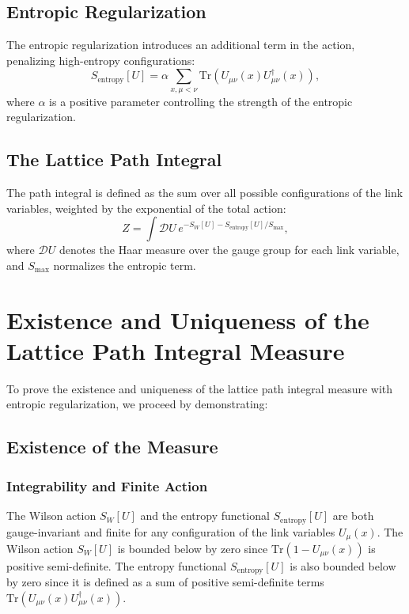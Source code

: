 \subsection{Entropic Regularization}  
The entropic regularization introduces an additional term in the action, penalizing high-entropy configurations:
\begin{equation}
S_{\text{entropy}}[U] = \alpha \sum_{x, \mu < \nu} \text{Tr}\left(U_{\mu\nu}(x) U_{\mu\nu}^\dagger(x)\right),
\end{equation}
where \(\alpha\) is a positive parameter controlling the strength of the entropic regularization.

\subsection{The Lattice Path Integral}  
The path integral is defined as the sum over all possible configurations of the link variables, weighted by the exponential of the total action:
\begin{equation}
Z = \int \mathcal{D}U \, e^{-S_W[U] - S_{\text{entropy}}[U]/S_{\text{max}}},
\end{equation}
where \(\mathcal{D}U\) denotes the Haar measure over the gauge group for each link variable, and \(S_{\text{max}}\) normalizes the entropic term.



\section{Existence and Uniqueness of the Lattice Path Integral Measure}

To prove the existence and uniqueness of the lattice path integral measure with 
entropic regularization, we proceed by demonstrating:

\subsection{Existence of the Measure}

\subsubsection{Integrability and Finite Action}
The Wilson action \(S_W[U]\) and the entropy functional \(S_{\text{entropy}}[U]\) are both gauge-invariant and finite for any configuration of the link variables \(U_\mu(x)\). The Wilson action \(S_W[U]\) is bounded below by zero since \(\text{Tr}(1 - U_{\mu\nu}(x))\) is positive semi-definite. The entropy functional \(S_{\text{entropy}}[U]\) is also bounded below by zero since it is defined as a sum of positive semi-definite terms \(\text{Tr}(U_{\mu\nu}(x) U_{\mu\nu}^\dagger(x))\).

